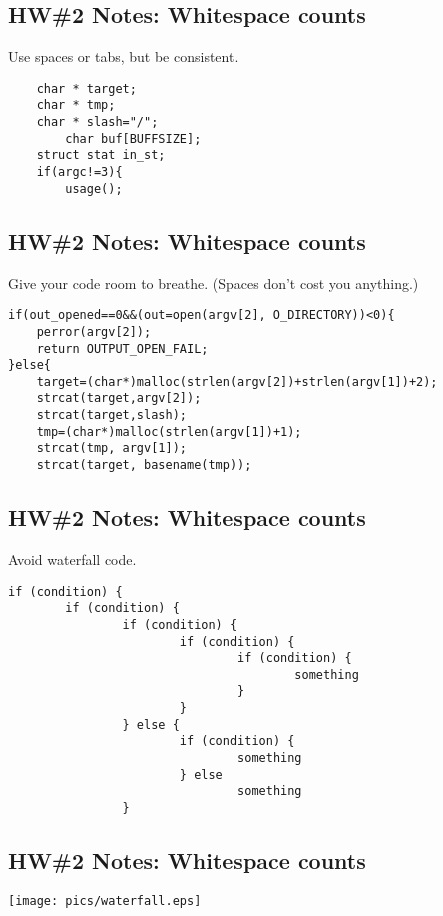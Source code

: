 \documentclass[xga]{xdvislides}
\begin{document}
\subsection{HW\#2 Notes: Whitespace counts}
Use spaces or tabs, but be consistent.
\Huge
\vspace*{\fill}
\begin{verbatim}
    char * target;
    char * tmp;
    char * slash="/";
        char buf[BUFFSIZE];
    struct stat in_st;
    if(argc!=3){
        usage();
\end{verbatim}
\vspace*{\fill}
\Normalsize

\subsection{HW\#2 Notes: Whitespace counts}
Give your code room to breathe. (Spaces don't cost you anything.)
\Huge
\vspace*{\fill}
\begin{verbatim}
if(out_opened==0&&(out=open(argv[2], O_DIRECTORY))<0){
    perror(argv[2]);
    return OUTPUT_OPEN_FAIL;
}else{
    target=(char*)malloc(strlen(argv[2])+strlen(argv[1])+2);
    strcat(target,argv[2]);
    strcat(target,slash);
    tmp=(char*)malloc(strlen(argv[1])+1);
    strcat(tmp, argv[1]);
    strcat(target, basename(tmp));
\end{verbatim}
\vspace*{\fill}
\Normalsize

\subsection{HW\#2 Notes: Whitespace counts}
Avoid waterfall code.
\vspace*{\fill}
\begin{verbatim}
if (condition) {
        if (condition) {
                if (condition) {
                        if (condition) {
                                if (condition) {
                                        something
                                }
                        }
                } else {
                        if (condition) {
                                something
                        } else
                                something
                }
\end{verbatim}
\vspace*{\fill}
\Normalsize

\subsection{HW\#2 Notes: Whitespace counts}
\vspace*{\fill}
\begin{center}
\texttt{[image: pics/waterfall.eps]}
\end{center}
\vspace*{\fill}
\end{document}
